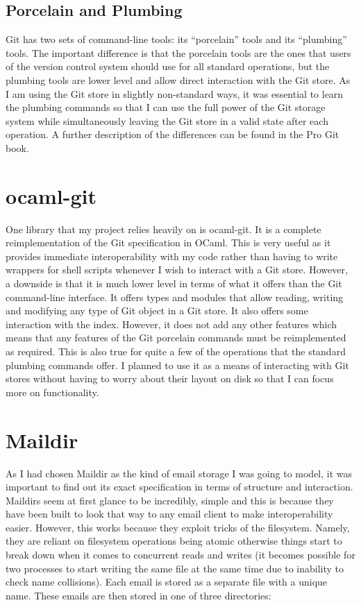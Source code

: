 \subsection{Porcelain and Plumbing}

Git has two sets of command-line tools: its ``porcelain'' tools and its ``plumbing'' tools. The important difference is that the porcelain tools are the ones that users of the version control system should use for all standard operations, but the plumbing tools are lower level and allow direct interaction with the Git store. As I am using the Git store in slightly non-standard ways, it was essential to learn the plumbing commands so that I can use the full power of the Git storage system while simultaneously leaving the Git store in a valid state after each operation. A further description of the differences can be found in the Pro Git book\cite{chacon2014git}.

\section{ocaml-git}

One library that my project relies heavily on is ocaml-git\cite{code_ocaml-git}. It is a complete reimplementation of the Git specification in OCaml. This is very useful as it provides immediate interoperability with my code rather than having to write wrappers for shell scripts whenever I wish to interact with a Git store. However, a downside is that it is much lower level in terms of what it offers than the Git command-line interface. It offers types and modules that allow reading, writing and modifying any type of Git object in a Git store. It also offers some interaction with the index. However, it does not add any other features which means that any features of the Git porcelain commands must be reimplemented as required. This is also true for quite a few of the operations that the standard plumbing commands offer. I planned to use it as a means of interacting with Git stores without having to worry about their layout on disk so that I can focus more on functionality.

\section{Maildir}

As I had chosen Maildir as the kind of email storage I was going to model, it was important to find out its exact specification in terms of structure and interaction. Maildirs seem at first glance to be incredibly, simple and this is because they have been built to look that way to any email client to make interoperability easier. However, this works because they exploit tricks of the filesystem. Namely, they are reliant on filesystem operations being atomic otherwise things start to break down when it comes to concurrent reads and writes (it becomes possible for two processes to start writing the same file at the same time due to inability to check name collisions).
Each email is stored as a separate file with a unique name. These emails are then stored in one of three directories:

